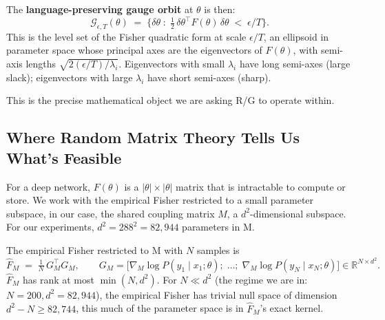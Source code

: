 \documentclass[11pt, a4paper]{article}
\theoremstyle{plain}
\theoremstyle{definition}
\theoremstyle{remark}
\begin{document}
The \textbf{language-preserving gauge orbit} at $\theta$ is then:
\begin{equation}
\mathcal{G}_{\epsilon, T}(\theta) \;=\; \big\{ \delta\theta \;:\; \tfrac{1}{2}\,\delta\theta^{\!\top} F(\theta) \,\delta\theta \;<\; \epsilon / T \big\}.
\end{equation}
This is the level set of the Fisher quadratic form at scale $\epsilon/T$, an ellipsoid in parameter space whose principal axes are the eigenvectors of $F(\theta)$, with semi-axis lengths $\sqrt{2(\epsilon/T) / \lambda_i}$.
Eigenvectors with small $\lambda_i$ have long semi-axes (large slack); eigenvectors with large $\lambda_i$ have short semi-axes (sharp).

This is the precise mathematical object we are asking R/G to operate within.

\subsection{Where Random Matrix Theory Tells Us What's Feasible}

For a deep network, $F(\theta)$ is a $|\theta| \times |\theta|$ matrix that is intractable to compute or store.
We work with the empirical Fisher restricted to a small parameter subspace, in our case, the shared coupling matrix $M$, a $d^{2}$-dimensional subspace.
For our experiments, $d^{2} = 288^{2} = 82{,}944$ parameters in M.

The empirical Fisher restricted to M with $N$ samples is
\begin{equation}
\hat{F}_M \;=\; \tfrac{1}{N}\, G_M^{\!\top} G_M, \qquad G_M = \big[\nabla_M \log P(y_1 \mid x_1; \theta);\; \ldots;\; \nabla_M \log P(y_N \mid x_N; \theta)\big] \in \mathbb{R}^{N \times d^{2}}.
\end{equation}
$\hat{F}_M$ has rank at most $\min(N, d^{2})$.
For $N \ll d^{2}$ (the regime we are in: $N = 200, d^{2} = 82{,}944$), the empirical Fisher has trivial null space of dimension $d^{2} - N \geq 82{,}744$, this much of the parameter space is in $\hat{F}_M$'s exact kernel.
\end{document}
